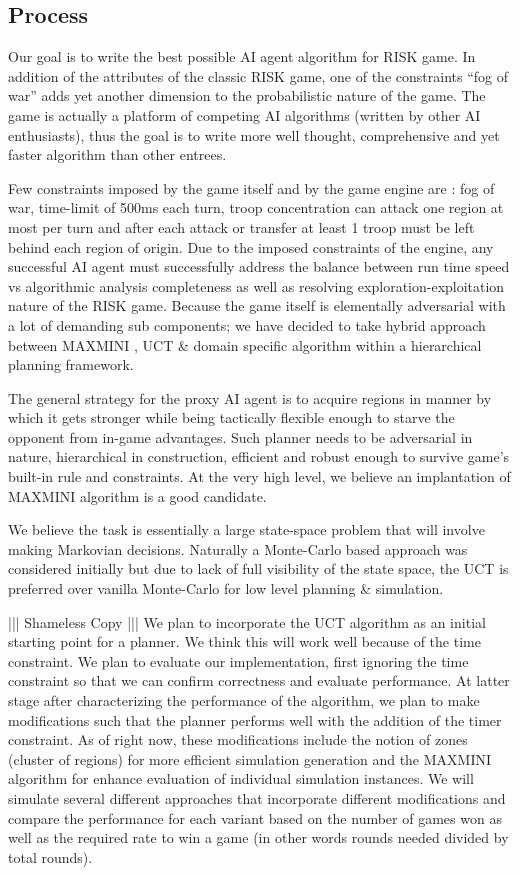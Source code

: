 \documentclass[a4paper,11pt]{article}
\begin{document}
\subsection{Process}\label{sec:process}
Our goal is to write the best possible AI agent algorithm for RISK game. In addition of the attributes of the classic RISK game, one of the constraints “fog of war” adds yet another dimension to the probabilistic nature of the game. The game is actually a platform of competing AI algorithms (written by other AI enthusiasts), thus the goal is to write more well thought, comprehensive and yet faster algorithm than other entrees.

Few constraints imposed by the game itself and by the game engine are : fog of war, time-limit of 500ms each turn, troop concentration can attack one region at most per turn and after each attack or transfer at least 1 troop must be left behind each region of origin. Due to the imposed constraints of the engine, any successful AI agent must successfully address the balance between run time speed vs algorithmic analysis completeness as well as resolving exploration-exploitation nature of the RISK game. Because the game itself is elementally adversarial with a lot of demanding sub components; we have decided to take hybrid approach between MAXMINI , UCT & domain specific algorithm within a hierarchical planning framework.

The general strategy for the proxy AI agent is to acquire regions in manner by which it gets stronger while being tactically flexible enough to starve the opponent from in-game advantages. Such planner needs to be adversarial in nature, hierarchical in construction, efficient and robust enough to survive game’s built-in rule and constraints. At the very high level, we believe an implantation of MAXMINI algorithm is a good candidate.

We believe the task is essentially a large state-space problem that will involve making Markovian decisions. Naturally a Monte-Carlo based approach was considered initially but due to lack of full visibility of the state space, the UCT is preferred over vanilla Monte-Carlo for low level planning & simulation.

||| Shameless Copy ||| We plan to incorporate the UCT algorithm as an initial starting point for a planner. We think this will work well because of the time constraint. We plan to evaluate our implementation, first ignoring the time constraint so that we can confirm correctness and evaluate performance. At latter stage after characterizing the performance of the algorithm, we plan to make modifications such that the planner performs well with the addition of the timer constraint. As of right now, these modifications include the notion of zones (cluster of regions) for more efficient simulation generation and the MAXMINI algorithm for enhance evaluation of individual simulation instances. We will simulate several different approaches that incorporate different modifications and compare the performance for each variant based on the number of games won as well as the required rate to win a game (in other words rounds needed divided by total rounds).
\end{document}
